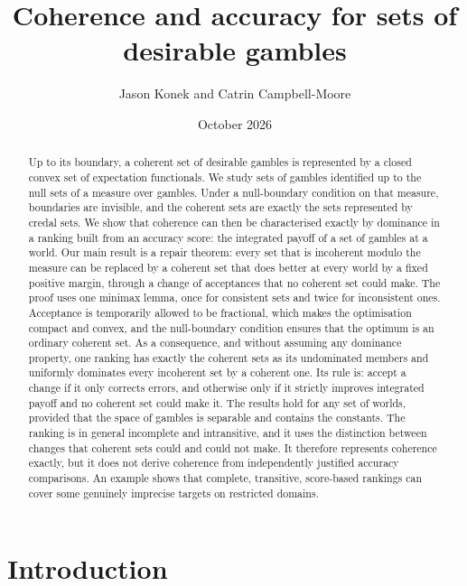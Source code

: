 \documentclass[11pt]{article}
\title{Coherence and accuracy for sets of desirable gambles}
\author{Jason Konek and Catrin Campbell-Moore}
\date{October 2026}
\theoremstyle{plain}
\theoremstyle{definition}
\theoremstyle{remark}
\begin{document}
\maketitle

\begin{abstract}
Up to its boundary, a coherent set of desirable gambles is represented by a closed convex set
of expectation functionals. We study sets of gambles identified up to the null sets of a
measure over gambles. Under a null-boundary condition on that measure, boundaries are
invisible, and the coherent sets are exactly the sets represented by credal sets. We show
that coherence can then be characterised exactly by dominance in a ranking built from an
accuracy score: the integrated payoff of a set of gambles at a world. Our main result is a
repair theorem: every set that is incoherent modulo the measure can be replaced by a coherent
set that does better at
every world by a fixed positive margin, through a change of acceptances that no coherent set
could make. The proof uses one minimax lemma, once for consistent sets and twice for
inconsistent ones. Acceptance is temporarily allowed to be fractional, which makes the
optimisation compact and convex, and the null-boundary condition ensures that the optimum is
an ordinary coherent set. As a consequence, and without assuming any dominance property, one
ranking has exactly the coherent sets as its
undominated members and uniformly dominates every incoherent set by a coherent one. Its rule
is: accept a change if it only corrects errors, and otherwise only if it strictly improves
integrated payoff and no coherent set could make it. The results hold for any set of worlds,
provided that the space of gambles is separable and contains the constants. The ranking is in
general incomplete and intransitive, and it uses the distinction between changes that
coherent sets could and could not make. It therefore represents coherence exactly, but it
does not derive coherence from independently justified accuracy comparisons. An example shows
that complete, transitive, score-based rankings can cover some genuinely imprecise targets on
restricted domains.
\end{abstract}

\section{Introduction}\label{sec:intro}
\end{document}
